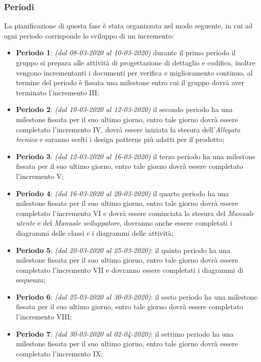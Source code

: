 \subsubsection{Periodi}
La pianificazione di questa fase è stata organizzata nel modo seguente, in cui ad ogni periodo corrisponde lo sviluppo di un incremento:
\begin{itemize}
\item \textbf{Periodo 1}: \textit{(dal 08-03-2020 al 10-03-2020)} durante il primo periodo il gruppo si prepara alle attività di progettazione di dettaglio e codifica, inoltre vengono incrementanti i documenti per verifica e miglioramento continuo, al termine del periodo è fissata una milestone entro cui il gruppo dovrà aver terminato l'incremento III;

\item \textbf{Periodo 2}: \textit{(dal 10-03-2020 al 12-03-2020)} il secondo periodo ha una milestone fissata per il suo ultimo giorno, entro tale giorno dovrà essere completato l'incremento IV, dovrà essere iniziata la stesura dell'\textit{Allegato tecnico} e saranno scelti i design patterns più adatti per il prodotto;

\item \textbf{Periodo 3}: \textit{(dal 12-03-2020 al 16-03-2020)} il terzo periodo ha una milestone fissata per il suo ultimo giorno, entro tale giorno dovrà essere completato l'incremento V;

\item \textbf{Periodo 4}: \textit{(dal 16-03-2020 al 20-03-2020)} il quarto periodo ha una milestone fissata per il suo ultimo giorno, entro tale giorno dovrà essere completato l'incremento VI e dovrà essere cominciata la stesura del \textit{Manuale utente} e del \textit{Manuale sviluppatore}, dovranno anche essere completati i diagrammi delle classi e i diagrammi delle attività;

\item \textbf{Periodo 5}: \textit{(dal 20-03-2020 al 25-03-2020)}: il quinto periodo ha una milestone fissata per il suo ultimo giorno, entro tale giorno dovrà essere completato l'incremento VII e dovranno essere completati i diagrammi di sequenza;

\item \textbf{Periodo 6}: \textit{(dal 25-03-2020 al 30-03-2020)}: il sesto periodo ha una milestone fissata per il suo ultimo giorno, entro tale giorno dovrà essere completato l'incremento VIII;

\item \textbf{Periodo 7}: \textit{(dal 30-03-2020 al 02-04-2020)}: il settimo periodo ha una milestone fissata per il suo ultimo giorno, entro tale giorno dovrà essere completato l'incremento IX;

\end{itemize}

